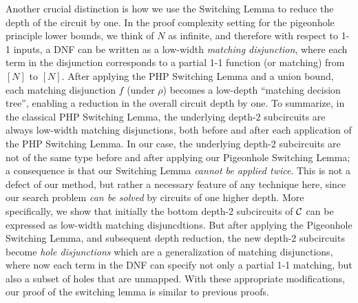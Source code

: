 Another crucial distinction is how we use the Switching Lemma to reduce the depth of the circuit by one. In the proof complexity setting for the pigeonhole principle lower bounds, we think of $N$ as infinite, and therefore with respect to 1-1 inputs, a DNF can be written as a low-width {\it matching disjunction}, where each term in the disjunction corresponds to a partial 1-1 function (or matching) from $[N]$ to $[N]$. After applying the PHP Switching Lemma and a union bound, each matching disjunction $f$ (under $\rho$) becomes a low-depth ``matching decision tree'', enabling a reduction in the overall circuit depth by one. To summarize, in the classical PHP Switching Lemma, the underlying depth-2 subcircuits are always low-width matching disjunctions, both before and after each application of the PHP Switching Lemma. 
In our case, the underlying depth-2 subcircuits are not of the same type before and after applying our Pigeonhole Switching Lemma; a consequence is that our Switching Lemma \emph{cannot be applied twice}. This is not a defect of our method, but rather a necessary feature of any technique here, since our search problem \emph{can be solved} by circuits of one higher depth. More specifically, we show that initially the bottom depth-2 subcircuits of ${\cal C}$ can be expressed as low-width matching disjuncdtions. But after applying the Pigeonhole Switching Lemma, and subsequent depth reduction, the new depth-2 subcircuits become \emph{hole disjunctions} which are a generalization of matching disjunctions, where now each term in the DNF can specify not only a partial 1-1 matching, but also a subset of holes that are unmapped.
With these appropriate modifications, our proof of the switching lemma is similar to previous proofs.

